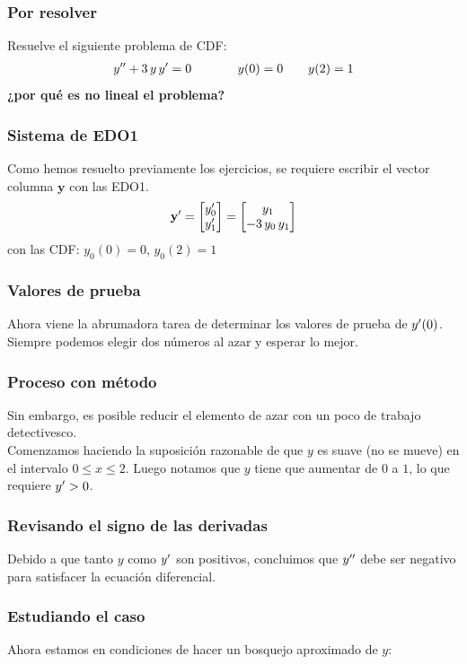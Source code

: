 \documentclass[12pt]{beamer}
\begin{document}
\begin{frame}
\frametitle{Por resolver}
Resuelve el siguiente problema de CDF:
\pause
\begin{align*}
{y}^{\prime \prime} + 3 \, y \, {y}^{\prime} = 0 \hspace{1.3cm} y (0) = 0 \hspace{0.7cm} y (2) = 1
\end{align*}
\pause
\textbf{¿por qué es no lineal el problema?}
\end{frame}
\begin{frame}
\frametitle{Sistema de EDO1}
Como hemos resuelto previamente los ejercicios, se requiere escribir el vector columna $\mathbf{y}$ con las EDO1.
\\
\bigskip
\pause
\begin{align*}
{\mathbf{y}}^{\prime} = \begin{bmatrix}
{y}^{\prime}_{0} \\
{y}^{\prime}_{1}
\end{bmatrix}
=
\begin{bmatrix}
y_{1} \\
- 3 \, y_{0} \, y_{1}
\end{bmatrix}
\end{align*}
con las CDF: $y_{0} (0) = 0$, $y_{0} (2) = 1$
\end{frame}
\begin{frame}
\frametitle{Valores de prueba}
Ahora viene la abrumadora tarea de determinar los valores de prueba de ${y}^{\prime} (0)$.
\\
\bigskip
\pause
Siempre podemos elegir dos números al azar y esperar lo mejor.
\end{frame}
\begin{frame}
\frametitle{Proceso con método}
Sin embargo, es posible reducir el elemento de azar con un poco de trabajo detectivesco.
\\
\bigskip
\pause
Comenzamos haciendo la suposición razonable de que $y$ es suave (no se mueve) en el intervalo $0 \leq x \leq 2$. Luego notamos que $y$ tiene que aumentar de $0$ a $1$, lo que requiere ${y}^{\prime} > 0$.
\end{frame}
\begin{frame}
\frametitle{Revisando el signo de las derivadas}
Debido a que tanto $y$ como ${y}^{\prime}$ son positivos, \pause concluimos que ${y}^{\prime \prime}$ debe ser negativo para satisfacer la ecuación diferencial.
\end{frame}
\begin{frame}
\frametitle{Estudiando el caso}
Ahora estamos en condiciones de hacer un bosquejo aproximado de $y$:
\pause
\begin{figure}
\centering
{}
\end{figure}
\end{frame}
\end{document}
